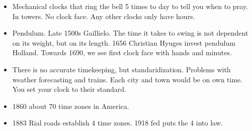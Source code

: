 \documentclass[11pt]{article}
\begin{document}
\begin{itemize}
\item Mechanical clocks that ring the bell 5 times to day to tell you when to pray. In towers. No clock face. Any other clocks only have hours.
\item Pendulum. Late 1500s Gaillielo. The time it takes to swing is not dependent on its weight, but on its length. 1656 Christian Hyuges invest pendulum Holland. Towards 1690, we see first clock face with hands and minutes. 
\item There is no accurate timekeeping, but standaridization. Problems with weather forecasting and trains. Each city and town would be on own time. You set your clock to their standard.
\item 1860 about 70 time zones in America. 
\item 1883 Rial roads establish 4 time zones. 1918 fed puts the 4 into law. 
\end{itemize} 
\end{document}
